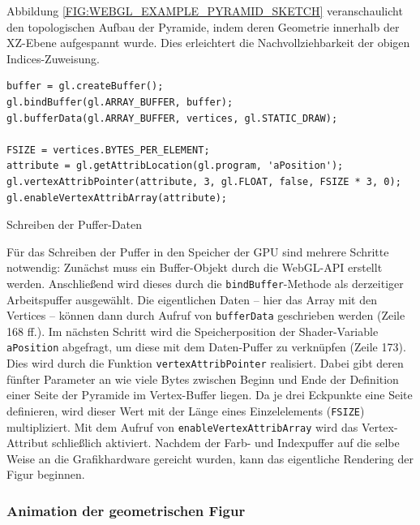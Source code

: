 Abbildung \ref{FIG:WEBGL_EXAMPLE_PYRAMID_SKETCH} veranschaulicht den topologischen Aufbau der Pyramide, indem deren Geometrie innerhalb der XZ-Ebene aufgespannt wurde. Dies erleichtert die Nachvollziehbarkeit der obigen Indices-Zuweisung.

\smallskip
\begin{listing}[!htb]
\begin{verbatim}
buffer = gl.createBuffer();
gl.bindBuffer(gl.ARRAY_BUFFER, buffer);
gl.bufferData(gl.ARRAY_BUFFER, vertices, gl.STATIC_DRAW);

FSIZE = vertices.BYTES_PER_ELEMENT;
attribute = gl.getAttribLocation(gl.program, 'aPosition');
gl.vertexAttribPointer(attribute, 3, gl.FLOAT, false, FSIZE * 3, 0);
gl.enableVertexAttribArray(attribute);
\end{verbatim}
\caption{Schreiben der Puffer-Daten}
\label{LISTING:WEBGL_BINDING_OF_BUFFERS}
\end{listing}

Für das Schreiben der Puffer in den Speicher der GPU sind mehrere Schritte notwendig: Zunächst muss ein Buffer-Objekt durch die WebGL-API erstellt werden. Anschließend wird dieses durch die \texttt{bindBuffer}-Methode als derzeitiger Arbeitspuffer ausgewählt. Die eigentlichen Daten -- hier das Array mit den Vertices -- können dann durch Aufruf von \texttt{bufferData} geschrieben werden (Zeile 168 ff.).
Im nächsten Schritt wird die Speicherposition der Shader-Variable \texttt{aPosition} abgefragt, um diese mit dem Daten-Puffer zu verknüpfen (Zeile 173). Dies wird durch die Funktion \texttt{vertexAttribPointer} realisiert. Dabei gibt deren fünfter Parameter an wie viele Bytes zwischen Beginn und Ende der Definition einer Seite der Pyramide im Vertex-Buffer liegen. Da je drei Eckpunkte eine Seite definieren, wird dieser Wert mit der Länge eines Einzelelements (\texttt{FSIZE}) multipliziert. Mit dem Aufruf von \texttt{enableVertexAttribArray} wird das Vertex-Attribut schließlich aktiviert. Nachdem der Farb- und Indexpuffer auf die selbe Weise an die Grafikhardware gereicht wurden, kann das eigentliche Rendering der Figur beginnen.

\subsubsection{Animation der geometrischen Figur}

